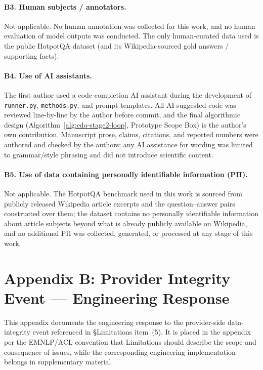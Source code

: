 \paragraph{B3. Human subjects / annotators.} Not applicable. No human annotation was collected for this work, and no human evaluation of model outputs was conducted. The only human-curated data used is the public HotpotQA dataset (and its Wikipedia-sourced gold answers / supporting facts).

\paragraph{B4. Use of AI assistants.} The first author used a code-completion AI assistant during the development of \texttt{runner.py}, \texttt{methods.py}, and prompt templates. All AI-suggested code was reviewed line-by-line by the author before commit, and the final algorithmic design (Algorithm~\ref{alg:edo-stage2-loop}, Prototype Scope Box) is the author's own contribution. Manuscript prose, claims, citations, and reported numbers were authored and checked by the authors; any AI assistance for wording was limited to grammar/style phrasing and did not introduce scientific content.

\paragraph{B5. Use of data containing personally identifiable information (PII).} Not applicable. The HotpotQA benchmark used in this work is sourced from publicly released Wikipedia article excerpts and the question--answer pairs constructed over them; the dataset contains no personally identifiable information about article subjects beyond what is already publicly available on Wikipedia, and no additional PII was collected, generated, or processed at any stage of this work.

\section*{Appendix B: Provider Integrity Event --- Engineering Response}
\label{sec:appendix-b}

This appendix documents the engineering response to the provider-side data-integrity event referenced in \S Limitations item~(5). It is placed in the appendix per the EMNLP/ACL convention that Limitations should describe the scope and consequence of issues, while the corresponding engineering implementation belongs in supplementary material.

